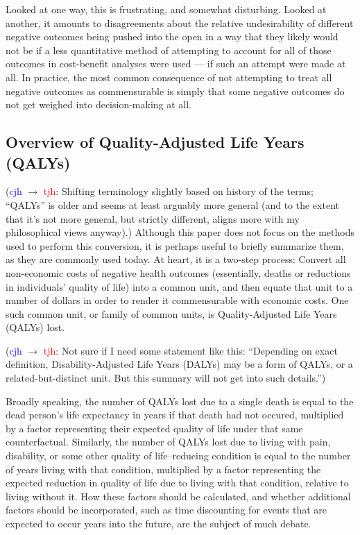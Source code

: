 \documentclass{article}
\newcommand{\cjh}{\textcolor{blue}{cjh}}
\newcommand{\tjh}{\textcolor{red}{tjh}}
\newcommand{\msg}[3]{(#1 $\rightarrow$ #2: #3)}
\newcommand{\mct}[1]{\msg\cjh\tjh{#1}}
\begin{document}
        Looked at one way, this is frustrating, and somewhat disturbing. Looked at another, it amounts to disagreements about the relative undesirability of different negative outcomes being pushed into the open in a way that they likely would not be if a less quantitative method of attempting to account for all of those outcomes in cost-benefit analyses were used --- if such an attempt were made at all. In practice, the most common consequence of not attempting to treat all negative outcomes as commensurable is simply that some negative outcomes do not get weighed into decision-making at all.

        \subsection{Overview of Quality-Adjusted Life Years (QALYs)}
            \mct{Shifting terminology slightly based on history of the terms; ``QALYs'' is older and seems at least arguably more general (and to the extent that it's not more general, but strictly different, aligns more with my philosophical views anyway).}
            Although this paper does not focus on the methods used to perform this conversion, it is perhaps useful to briefly summarize them, as they are commonly used today. At heart, it is a two-step process: Convert all non-economic costs of negative health outcomes (essentially, deaths or reductions in individuals' quality of life) into a common unit, and then equate that unit to a number of dollars in order to render it commensurable with economic costs. One such common unit, or family of common units, is Quality-Adjusted Life Years (QALYs) lost.
            
            \mct{Not sure if I need some statement like this: ``Depending on exact definition, Disability-Adjusted Life Years (DALYs) may be a form of QALYs, or a related-but-distinct unit. But this summary will not get into such details.''}

            Broadly speaking, the number of QALYs lost due to a single death is equal to the dead person's life expectancy in years if that death had not occured, multiplied by a factor representing their expected quality of life under that same counterfactual. Similarly, the number of QALYs lost due to living with pain, disability, or some other quality of life--reducing condition is equal to the number of years living with that condition, multiplied by a factor representing the expected reduction in quality of life due to living with that condition, relative to living without it. How these factors should be calculated, and whether additional factors should be incorporated, such as time discounting for events that are expected to occur years into the future, are the subject of much debate.
\end{document}
